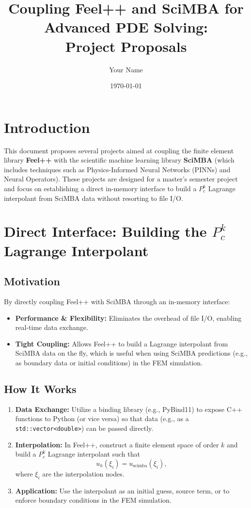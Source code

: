 \documentclass[11pt]{article}
\title{Coupling Feel++ and SciMBA for Advanced PDE Solving:\\ Project Proposals}
\author{Your Name}
\date{\today}
\begin{document}
\maketitle

\section{Introduction}
This document proposes several projects aimed at coupling the finite element library \textbf{Feel++} with the scientific machine learning library \textbf{SciMBA} (which includes techniques such as Physics-Informed Neural Networks (PINNs) and Neural Operators). These projects are designed for a master’s semester project and focus on establishing a direct in-memory interface to build a \( P_c^k \) Lagrange interpolant from SciMBA data without resorting to file I/O.

\section{Direct Interface: Building the \( P_c^k \) Lagrange Interpolant}

\subsection{Motivation}
By directly coupling Feel++ with SciMBA through an in-memory interface:
\begin{itemize}
    \item \textbf{Performance \& Flexibility:} Eliminates the overhead of file I/O, enabling real-time data exchange.
    \item \textbf{Tight Coupling:} Allows Feel++ to build a Lagrange interpolant from SciMBA data on the fly, which is useful when using SciMBA predictions (e.g., as boundary data or initial conditions) in the FEM simulation.
\end{itemize}

\subsection{How It Works}
\begin{enumerate}[label=\arabic*.]
    \item \textbf{Data Exchange:} Utilize a binding library (e.g., PyBind11) to expose C++ functions to Python (or vice versa) so that data (e.g., as a \texttt{std::vector<double>}) can be passed directly.
    \item \textbf{Interpolation:} In Feel++, construct a finite element space of order \( k \) and build a \( P_c^k \) Lagrange interpolant such that
    \[
    u_h(\xi_i) = u_{\text{scimba}}(\xi_i),
    \]
    where \(\xi_i\) are the interpolation nodes.
    \item \textbf{Application:} Use the interpolant as an initial guess, source term, or to enforce boundary conditions in the FEM simulation.
\end{enumerate}
\end{document}
